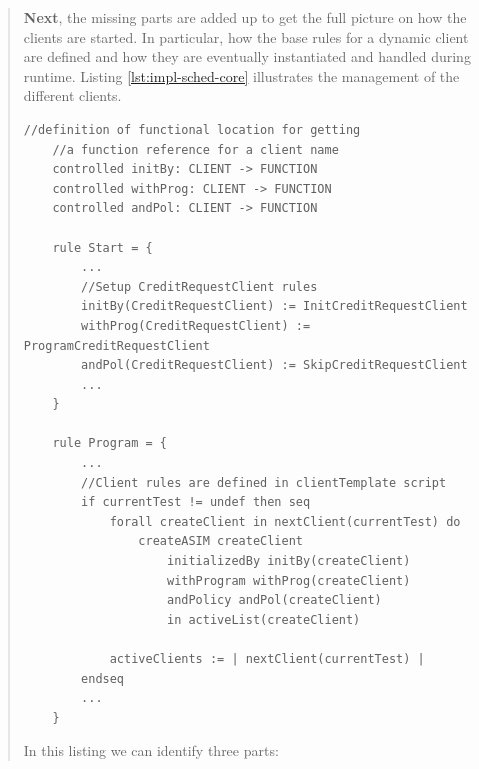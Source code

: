 \begin{quote}
\textbf{Next}, the missing parts are added up to get the full picture on how the clients are started. In particular, how the base rules for a dynamic client are defined and how they are eventually instantiated and handled during runtime. Listing \ref{lst:impl-sched-core} illustrates the management of the different clients.

\begin{center}
\begin{minipage}{0.8\textwidth}
\small
\begin{lstlisting}[language=bsl_lst,caption={\bf\small Scheduler core functionality},label={lst:impl-sched-core} ]
	//definition of functional location for getting
	//a function reference for a client name
	controlled initBy: CLIENT -> FUNCTION
	controlled withProg: CLIENT -> FUNCTION
	controlled andPol: CLIENT -> FUNCTION
	
	rule Start = {
		...
		//Setup CreditRequestClient rules
		initBy(CreditRequestClient) := InitCreditRequestClient
		withProg(CreditRequestClient) := ProgramCreditRequestClient
		andPol(CreditRequestClient) := SkipCreditRequestClient
		...
	}
	
	rule Program = {
		...
		//Client rules are defined in clientTemplate script
		if currentTest != undef then seq			
			forall createClient in nextClient(currentTest) do
				createASIM createClient
					initializedBy initBy(createClient)
					withProgram withProg(createClient)
					andPolicy andPol(createClient)
					in activeList(createClient)
					
			activeClients := | nextClient(currentTest) |
		endseq
		...
	}
\end{lstlisting}
\end{minipage}
\end{center}

In this listing we can identify three parts:


\end{quote}
